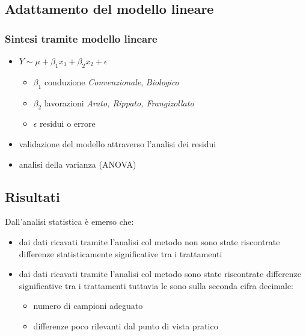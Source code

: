 \documentclass[10pt]{beamer}
\begin{document}
\subsection{Adattamento del modello lineare}
\begin{frame}
  \frametitle{Sintesi tramite modello lineare}
  \begin{itemize}
    \item 
    \vspace{0.25cm}
    $Y \sim \mu + \beta_1x_1 + \beta_2x_2 + \epsilon$
    \vspace{0.25cm}

    \begin{itemize}

      \item $\beta_1$ conduzione \newline
      \emph{Convenzionale}, \emph{Biologico}

      \item $\beta_2$ lavorazioni \newline \emph{Arato, Rippato,
        Frangizollato}

      \item$\epsilon$ residui o errore
    \end{itemize}
    \item validazione del modello attraverso l'analisi
    dei residui 
    \item analisi della varianza (ANOVA)
  \end{itemize}
\end{frame}

\subsection{Risultati}
\begin{frame}[label=densita]
  Dall'analisi statistica \`e emerso che:
  \begin{itemize}[<+->]
  \item dai dati ricavati tramite
    l'analisi col metodo \hyperlink{Core}{} non sono
    state riscontrate differenze statisticamente significative tra i
    trattamenti
  \item dai dati ricavati tramite l'analisi col metodo
    \hyperlink{Clod}{} sono state riscontrate
    differenze significative tra i trattamenti tuttavia le \hyperlink{summary}{}
    sono sulla seconda cifra decimale:
    \begin{itemize}[<+->]
    \item numero di campioni adeguato
    \item differenze poco rilevanti dal punto di vista pratico
    \end{itemize}
  \end{itemize}
\end{frame}
\end{document}

